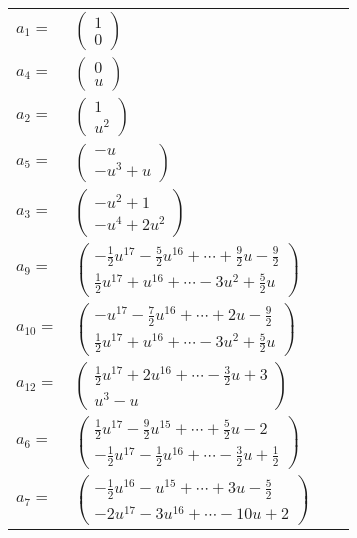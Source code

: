 \documentclass[1p]{elsarticle_modified}
\theoremstyle{definition}
\begin{document}
\begin{tabular}{m{7pt} m{180pt} m{7pt} m{180pt} }
\flushright $a_{1}=$&$\begin{pmatrix}1\\0\end{pmatrix}$ \\
\flushright $a_{4}=$&$\begin{pmatrix}0\\u\end{pmatrix}$ \\
\flushright $a_{2}=$&$\begin{pmatrix}1\\u^2\end{pmatrix}$ \\
\flushright $a_{5}=$&$\begin{pmatrix}- u\\- u^3+u\end{pmatrix}$ \\
\flushright $a_{3}=$&$\begin{pmatrix}- u^2+1\\- u^4+2 u^2\end{pmatrix}$ \\
\flushright $a_{9}=$&$\begin{pmatrix}-\frac{1}{2} u^{17}-\frac{5}{2} u^{16}+\cdots+\frac{9}{2} u-\frac{9}{2}\\\frac{1}{2} u^{17}+u^{16}+\cdots-3 u^2+\frac{5}{2} u\end{pmatrix}$ \\
\flushright $a_{10}=$&$\begin{pmatrix}- u^{17}-\frac{7}{2} u^{16}+\cdots+2 u-\frac{9}{2}\\\frac{1}{2} u^{17}+u^{16}+\cdots-3 u^2+\frac{5}{2} u\end{pmatrix}$ \\
\flushright $a_{12}=$&$\begin{pmatrix}\frac{1}{2} u^{17}+2 u^{16}+\cdots-\frac{3}{2} u+3\\u^3- u\end{pmatrix}$ \\
\flushright $a_{6}=$&$\begin{pmatrix}\frac{1}{2} u^{17}-\frac{9}{2} u^{15}+\cdots+\frac{5}{2} u-2\\-\frac{1}{2} u^{17}-\frac{1}{2} u^{16}+\cdots-\frac{3}{2} u+\frac{1}{2}\end{pmatrix}$ \\
\flushright $a_{7}=$&$\begin{pmatrix}-\frac{1}{2} u^{16}- u^{15}+\cdots+3 u-\frac{5}{2}\\-2 u^{17}-3 u^{16}+\cdots-10 u+2\end{pmatrix}$ \\

\end{tabular}
\end{document}
